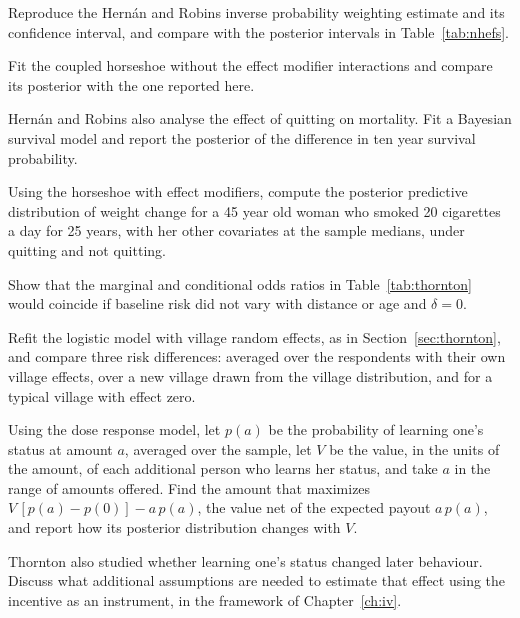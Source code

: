 \begin{exercises}
\item\label{ex:chnhefs:1} Reproduce the Hern\'an and Robins inverse probability weighting estimate and its confidence interval, and compare with the posterior intervals in Table~\ref{tab:nhefs}.
\item\label{ex:chnhefs:2} Fit the coupled horseshoe without the effect modifier interactions and compare its posterior with the one reported here.
\item\label{ex:chnhefs:3} Hern\'an and Robins also analyse the effect of quitting on mortality. Fit a Bayesian survival model and report the posterior of the difference in ten year survival probability.
\item\label{ex:chnhefs:4} Using the horseshoe with effect modifiers, compute the posterior predictive distribution of weight change for a 45 year old woman who smoked 20 cigarettes a day for 25 years, with her other covariates at the sample medians, under quitting and not quitting.

\item\label{ex:chthornton:1} Show that the marginal and conditional odds ratios in Table~\ref{tab:thornton} would coincide if baseline risk did not vary with distance or age and $\delta = 0$.
\item\label{ex:chthornton:2} Refit the logistic model with village random effects, as in Section~\ref{sec:thornton}, and compare three risk differences: averaged over the respondents with their own village effects, over a new village drawn from the village distribution, and for a typical village with effect zero.
\item\label{ex:chthornton:3} Using the dose response model, let $p(a)$ be the probability of learning one's status at amount $a$, averaged over the sample, let $V$ be the value, in the units of the amount, of each additional person who learns her status, and take $a$ in the range of amounts offered. Find the amount that maximizes $V\,[p(a) - p(0)] - a\,p(a)$, the value net of the expected payout $a\,p(a)$, and report how its posterior distribution changes with $V$.
\item\label{ex:chthornton:4} Thornton also studied whether learning one's status changed later behaviour. Discuss what additional assumptions are needed to estimate that effect using the incentive as an instrument, in the framework of Chapter~\ref{ch:iv}.
\end{exercises}
